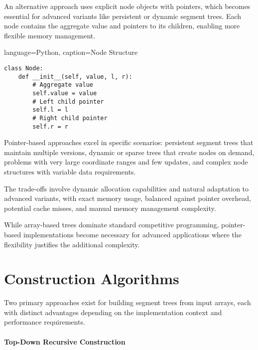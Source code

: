 An alternative approach uses explicit node objects with pointers, which becomes essential for advanced variants like persistent or dynamic segment trees. Each node contains the aggregate value and pointers to its children, enabling more flexible memory management.

\begin{marginlisting}[0pt]{language=Python, caption=Node Structure}
\begin{lstlisting}
class Node:
    def __init__(self, value, l, r):
        # Aggregate value
        self.value = value          
        # Left child pointer
        self.l = l
        # Right child pointer
        self.r = r
\end{lstlisting}
\end{marginlisting}

Pointer-based approaches excel in specific scenarios: persistent segment trees that maintain multiple versions, dynamic or sparse trees that create nodes on demand, problems with very large coordinate ranges and few updates, and complex node structures with variable data requirements.

The trade-offs involve dynamic allocation capabilities and natural adaptation to advanced variants, with exact memory usage, balanced against pointer overhead, potential cache misses, and manual memory management complexity.

While array-based trees dominate standard competitive programming, pointer-based implementations become necessary for advanced applications where the flexibility justifies the additional complexity.

\section{Construction Algorithms}
\label{sec:build_algorithms}

Two primary approaches exist for building segment trees from input arrays, each with distinct advantages depending on the implementation context and performance requirements.

\paragraph{Top-Down Recursive Construction}

